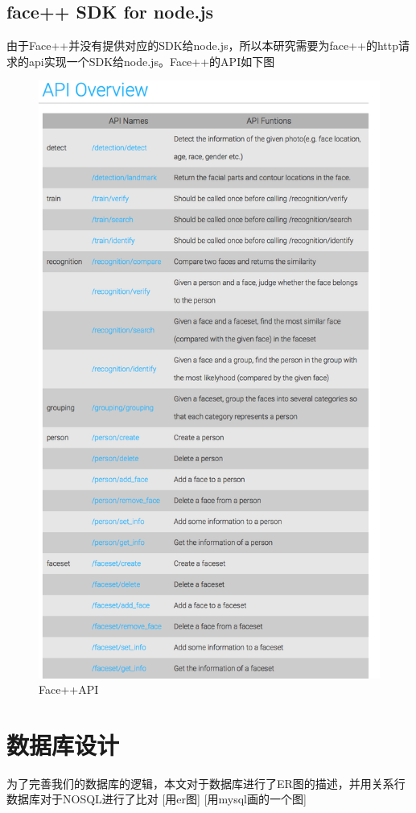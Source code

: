 \subsection{face++ SDK for node.js}
由于Face++并没有提供对应的SDK给node.js，所以本研究需要为face++的http请求的api实现一个SDK给node.js。Face++的API如下图
\begin{figure}[h]
\begin{minipage}[t]{0.45\linewidth}
\centering
\includegraphics[width=\textwidth]{img/chap3/Face++API.png}
\caption{Face++API\label{Face++API}}
\end{minipage}
\end{figure}




\section{数据库设计}
为了完善我们的数据库的逻辑，本文对于数据库进行了ER图的描述，并用关系行数据库对于NOSQL进行了比对
[用er图]
[用mysql画的一个图]





